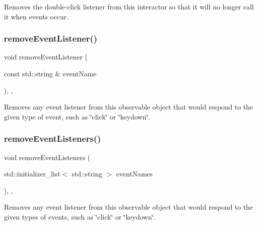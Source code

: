 Removes the double-\/click listener from this interactor so that it will no longer call it when events occur. 

\mbox{\label{classsgl_1_1GObservable_acbcf1ed3a851ad8a3c17ef38d86b481d}} 
\subsubsection{\texorpdfstring{remove\+Event\+Listener()}{removeEventListener()}}
{\footnotesize\ttfamily void remove\+Event\+Listener (\begin{DoxyParamCaption}\item[{const std\+::string \&}]{event\+Name }\end{DoxyParamCaption})\hspace{0.3cm}{\ttfamily [protected]}, {\ttfamily [virtual]}, {\ttfamily [inherited]}}



Removes any event listener from this observable object that would respond to the given type of event, such as \char`\"{}click\char`\"{} or \char`\"{}keydown\char`\"{}. 

\mbox{\label{classsgl_1_1GObservable_af51cc35c29a1bd1908609d432decdbb6}} 
\subsubsection{\texorpdfstring{remove\+Event\+Listeners()}{removeEventListeners()}}
{\footnotesize\ttfamily void remove\+Event\+Listeners (\begin{DoxyParamCaption}\item[{std\+::initializer\+\_\+list$<$ std\+::string $>$}]{event\+Names }\end{DoxyParamCaption})\hspace{0.3cm}{\ttfamily [protected]}, {\ttfamily [virtual]}, {\ttfamily [inherited]}}



Removes any event listener from this observable object that would respond to the given types of events, such as \char`\"{}click\char`\"{} or \char`\"{}keydown\char`\"{}. 


